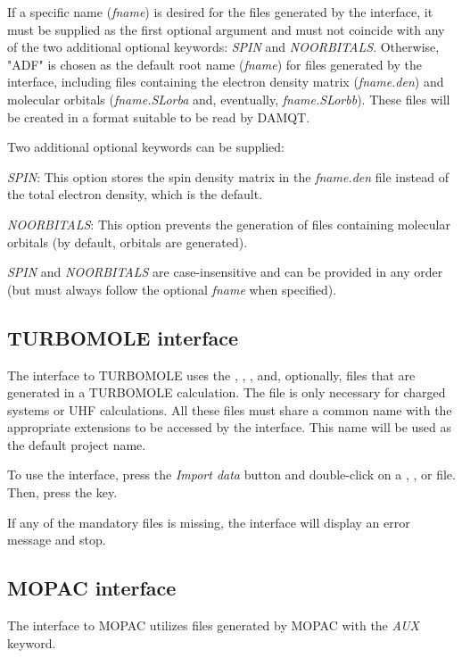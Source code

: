 \documentclass[10pt]{article}
\begin{document}
If a specific name ({\it fname}) is desired for the files generated 
by the interface, it must be supplied 
as the first optional argument and must not coincide 
with any of the two additional optional keywords: {\it SPIN} and {\it NOORBITALS}. Otherwise,
"ADF" is chosen as the default root name ({\it fname}) 
for files generated by the interface, including files containing the electron 
density matrix ({\it fname.den}) and molecular orbitals ({\it fname.SLorba} and, 
eventually, {\it fname.SLorbb}). These files will be created in a format suitable to be 
read by DAMQT.

Two additional optional keywords can be supplied:

{\it SPIN}: This option stores the spin density matrix in the {\it fname.den} file instead of 
the total electron density, which is the default.

{\it NOORBITALS}: This option prevents the generation of files containing molecular orbitals (by 
default, orbitals are generated).

{\it SPIN} and {\it NOORBITALS} are case-insensitive and can be provided in any order 
(but must always follow the optional {\it fname} when specified).


\subsection{TURBOMOLE interface \label{sec:5.4}}

The interface to TURBOMOLE uses the \basis{ }, \mos{ }, \coords{ }, and,
optionally, \control{ } files that are generated in a TURBOMOLE calculation.
The \control{ } file is only necessary for charged systems or UHF
calculations. All these files must share a common name with the appropriate 
extensions to be accessed by the interface. This name will be used as the default project name.

To use the interface, press the {\it Import data} button \teclapuntos and double-click
on a \basis{ }, \mos{ }, or \coords{ } file. Then, press the \exec key.

If any of the mandatory files is missing, the interface will display an error message and stop.

\subsection{MOPAC interface \label{sec:5.5}}

The interface to MOPAC utilizes \aux{ } files generated by MOPAC with the {\it AUX} keyword.
\end{document}
